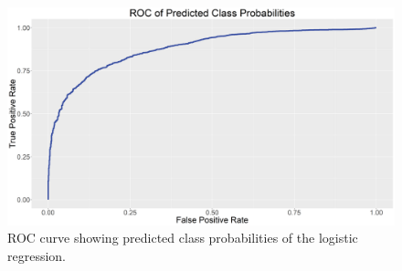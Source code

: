 \documentclass{llncs}
\begin{document}
\FloatBarrier
\begin{figure}
\includegraphics[width=\textwidth, height=\textheight, keepaspectratio]{000LogisticModelROC.png}
\caption{ROC curve showing predicted class probabilities of the logistic regression.}
\label{figure:LogisticROC}

\end{figure}
\FloatBarrier
\end{document}
